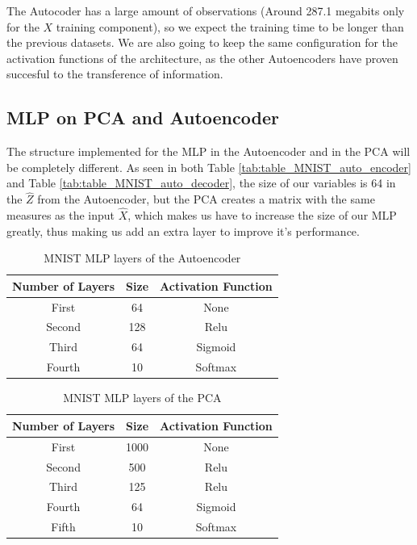 The Autocoder has a large amount of observations (Around 287.1 megabits only for the $X$ training component), so we expect the training time to be longer than the previous datasets. We are also going to keep the same configuration for the activation functions of the architecture, as the other Autoencoders  have proven succesful to the transference of information.

\subsection{MLP on PCA and Autoencoder}

The structure implemented for the MLP in the Autoencoder and in the PCA will be completely different. As seen in both Table \ref{tab:table_MNIST_auto_encoder} and Table \ref{tab:table_MNIST_auto_decoder}, the size of our variables is 64 in the $\hat{Z}$ from the Autoencoder, but the PCA creates a matrix with the same measures as the input $\hat{X}$, which makes us have to increase the size of our MLP greatly, thus making us add an extra layer to improve it's performance.
\par	

\begin{table}[H]
	\caption{MNIST MLP layers of the Autoencoder}
	\begin{center}
		\label{tab:table_MNIST_MLP_auto}
		\begin{tabular}{c|c|c} %
			\textbf{Number of Layers} & \textbf{Size} & \textbf{Activation Function} \\
			\hline
			First & 64 & None\\
			Second & 128 & Relu\\
			Third & 64  & Sigmoid\\
			Fourth & 10 & Softmax\\
		\end{tabular}
	\end{center}
\end{table}

\begin{table}[H]
	\caption{MNIST MLP layers of the PCA}
	\begin{center}
		\label{tab:table_MNIST_MLP_pca}
		\begin{tabular}{c|c|c} %
			\textbf{Number of Layers} & \textbf{Size} & \textbf{Activation Function} \\
			\hline
			First & 1000 & None\\
			Second & 500 & Relu\\
			Third & 125  & Relu\\
			Fourth & 64 & Sigmoid\\
			Fifth & 10 & Softmax \\
		\end{tabular}
	\end{center}
\end{table}

